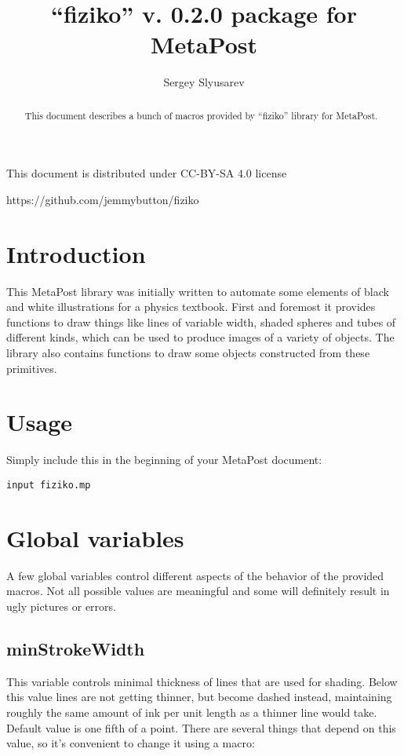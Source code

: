 \documentclass{ltxdoc}
\author{Sergey Slyusarev}
\title{``fiziko'' v. 0.2.0 package for MetaPost}
\begin{document}
\maketitle

\begin{abstract}
This document describes a bunch of macros provided by ``fiziko'' library for MetaPost.
\end{abstract}

\begin{centering}

This document is distributed under CC-BY-SA 4.0 license 

\ccbysa

https://github.com/jemmybutton/fiziko

\end{centering}

\section{Introduction}
This MetaPost library was initially written to automate some elements of black and white illustrations for a physics textbook. First and foremost it provides functions to draw things like lines of variable width, shaded spheres and tubes of different kinds, which can be used to produce images of a variety of objects. The library also contains functions to draw some objects constructed from these primitives.

\section{Usage}
Simply include this in the beginning of your MetaPost document:

\begin{lstlisting}
input fiziko.mp
\end{lstlisting}

\section{Global variables}
A few global variables control different aspects of the behavior of the provided macros. Not all possible values are meaningful and some will definitely result in ugly pictures or errors.

\subsection{minStrokeWidth}
This variable controls minimal thickness of lines that are used for shading. Below this value lines are not getting thinner, but become dashed instead, maintaining roughly the same amount of ink per unit length as a thinner line would take. Default value is one fifth of a point. There are several things that depend on this value, so it's convenient to change it using a macro:
\end{document}

